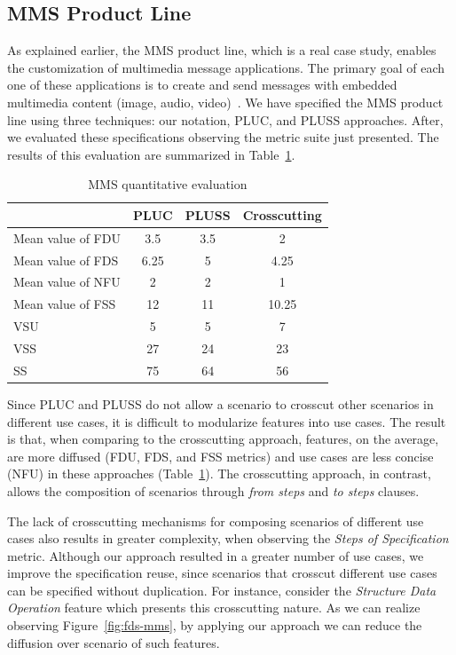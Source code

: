 \documentclass{acm_proc_article-sp}
\begin{document}
\subsection{MMS Product Line}

As explained earlier, the MMS product line, which is a real case study, enables the customization of 
multimedia message applications. The primary goal of each one of these applications is to create and 
send messages with embedded multimedia content (image, audio, video)~\cite{rbonifacio-ea-2008}. 
We have specified the MMS product line using three techniques: our notation, PLUC, and PLUSS approaches. After, we evaluated these specifications observing the metric suite just presented. The results of this evaluation are summarized in Table~\ref{tab:metrics}. 

\begin{table}[htb]
\centering
\caption{MMS quantitative evaluation}
\label{tab:metrics}
\begin{small}
\begin{tabular}{lccc} \hline
					& PLUC 	& PLUSS 	& Crosscutting	\\ \hline
Mean value of FDU 		& 3.5	& 3.5	& 2		\\
Mean value of FDS 		& 6.25	& 5		& 4.25	\\
Mean value of NFU 		& 2		& 2		& 1		\\
Mean value of FSS 		&12		& 11		& 10.25	\\ 
VSU 					& 5		& 5		& 7		\\
VSS 					& 27		& 24		& 23		\\
SS 					& 75		& 64		& 56		\\	\hline
\end{tabular}
\end{small}
\end{table}

Since PLUC and PLUSS do not allow a
scenario to crosscut other scenarios in different use cases, it
is difficult to modularize features into use cases. The
result is that, when comparing to the crosscutting approach,
features, on the average,  are more 
diffused (FDU, FDS, and FSS metrics) and use cases are
less concise (NFU) in these approaches (Table~\ref{tab:metrics}). The crosscutting
approach, in contrast, allows the composition of scenarios
through \emph{from steps} and \emph{to steps} clauses. 

The lack of crosscutting mechanisms for composing scenarios of different use cases also results in greater complexity, when observing the \emph{Steps of Specification} metric. Although our approach resulted in a greater number of use cases, we improve the specification reuse, since scenarios that crosscut different use cases can be specified without duplication. For instance, consider the \emph{Structure Data Operation} feature which presents this crosscutting nature. As we can realize observing Figure~\ref{fig:fds-mms}, by applying our approach we can reduce the diffusion over scenario of such features.
\end{document}
